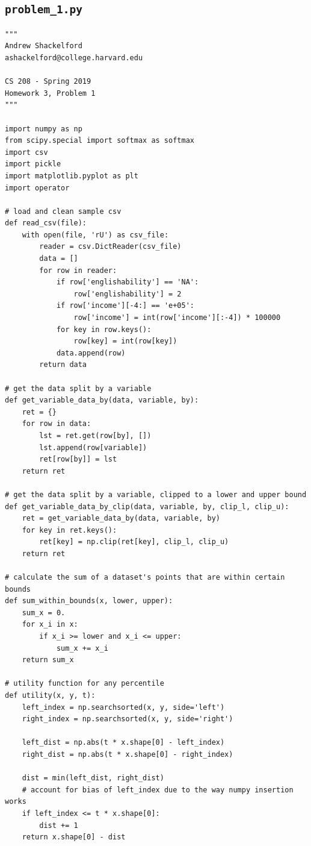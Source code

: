 \documentclass[12pt]{article}
\def\cl{\lstinline}
\begin{document}
\newpage

\begin{appendices}

\section{\cl{problem_1.py}}
\label{appendix:problem_1}

\begin{lstlisting}
"""
Andrew Shackelford
ashackelford@college.harvard.edu

CS 208 - Spring 2019
Homework 3, Problem 1
"""

import numpy as np
from scipy.special import softmax as softmax
import csv
import pickle
import matplotlib.pyplot as plt
import operator

# load and clean sample csv
def read_csv(file):
    with open(file, 'rU') as csv_file:
        reader = csv.DictReader(csv_file)
        data = []
        for row in reader:
            if row['englishability'] == 'NA':
                row['englishability'] = 2
            if row['income'][-4:] == 'e+05':
                row['income'] = int(row['income'][:-4]) * 100000
            for key in row.keys():
                row[key] = int(row[key])
            data.append(row)
        return data

# get the data split by a variable
def get_variable_data_by(data, variable, by):
    ret = {}
    for row in data:
        lst = ret.get(row[by], [])
        lst.append(row[variable])
        ret[row[by]] = lst
    return ret

# get the data split by a variable, clipped to a lower and upper bound
def get_variable_data_by_clip(data, variable, by, clip_l, clip_u):
    ret = get_variable_data_by(data, variable, by)
    for key in ret.keys():
        ret[key] = np.clip(ret[key], clip_l, clip_u)
    return ret

# calculate the sum of a dataset's points that are within certain bounds
def sum_within_bounds(x, lower, upper):
    sum_x = 0.
    for x_i in x:
        if x_i >= lower and x_i <= upper:
            sum_x += x_i
    return sum_x 

# utility function for any percentile
def utility(x, y, t):
    left_index = np.searchsorted(x, y, side='left')
    right_index = np.searchsorted(x, y, side='right')

    left_dist = np.abs(t * x.shape[0] - left_index)
    right_dist = np.abs(t * x.shape[0] - right_index)

    dist = min(left_dist, right_dist)
    # account for bias of left_index due to the way numpy insertion works
    if left_index <= t * x.shape[0]:
        dist += 1
    return x.shape[0] - dist


\end{lstlisting}
\end{appendices}
\end{document}
